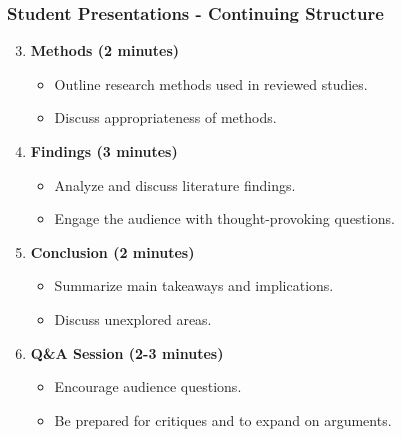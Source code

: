 \documentclass[aspectratio=169]{beamer}
\begin{document}
\begin{frame}[fragile]
    \frametitle{Student Presentations - Continuing Structure}
    \begin{enumerate}
        \setcounter{enumii}{2} %
        \item \textbf{Methods (2 minutes)}
        \begin{itemize}
            \item Outline research methods used in reviewed studies.
            \item Discuss appropriateness of methods.
        \end{itemize}

        \item \textbf{Findings (3 minutes)}
        \begin{itemize}
            \item Analyze and discuss literature findings.
            \item Engage the audience with thought-provoking questions.
        \end{itemize}

        \item \textbf{Conclusion (2 minutes)}
        \begin{itemize}
            \item Summarize main takeaways and implications.
            \item Discuss unexplored areas.
        \end{itemize}

        \item \textbf{Q\&A Session (2-3 minutes)}
        \begin{itemize}
            \item Encourage audience questions.
            \item Be prepared for critiques and to expand on arguments.
        \end{itemize}
    \end{enumerate}
\end{frame}
\end{document}
